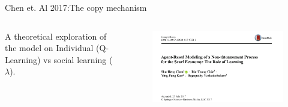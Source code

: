 \documentclass[12pt, notes=show]{beamer}
\begin{document}
\begin{frame}{Chen et. Al 2017:The copy mechanism}
	\begin{columns}
		\begin{column}{.5\textwidth}
    \footnotesize
    A theoretical exploration of the model on Individual (Q-Learning) vs social learning ($\lambda$).
		\end{column}
		\begin{column}{.5\textwidth}
    \begin{figure}
	\includegraphics[width=\textwidth]{images/chenetAlComput.png}
    \end{figure}
		\end{column}
	\end{columns}
    \footnotesize
    \vspace{.5cm}




\end{frame}
\end{document}
